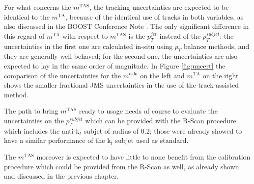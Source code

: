 \documentclass[UKenglish,texlive=2013]{\ATLASLATEXPATH atlasdoc}
\newcommand{\mta}{\ensuremath{m^\textrm{TA}}\xspace}
\newcommand{\mtas}{\ensuremath{m^\textrm{TAS}}\xspace}
\newcommand{\mcal}{\ensuremath{m^\textrm{calo}}\xspace}
\begin{document}
For what concerns the $\mtas$, the tracking uncertainties are expected to be identical to the $\mta$, because of the identical use of tracks in both variables, as also discussed in the BOOST Conference Note \cite{art35}.
The only significant difference in this regard of $\mta$ with respect to $\mtas$ is the $p_T^{jet}$ instead of the $p_T^{subjet}$: the uncertainties in the first one are calculated in-situ using $p_T$ balance methods, and they are generally well-behaved; for the second one, the uncertainties are also expected to lay in the same order of magnitude. In Figure \ref{fig:uncert} the comparison of the uncertainties for the $\mcal$ on the left and $\mta$ on the right shows the smaller fractional JMS uncertainties in the use of the track-assisted method.

The path to bring $\mtas$ ready to usage needs of course to evaluate the uncertainties on the  $p_T^{subjet}$ which can be provided with the R-Scan procedure which includes the anti-k$_t$ subjet of radius of 0.2; those were already showed to have a similar performance of the k$_t$ subjet used as standard.

The $\mtas$ moreover is expected to have little to none benefit from the calibration procedure which could be provided from the R-Scan as well, as already shown and discussed in the previous chapter. 





\clearpage
\end{document}
